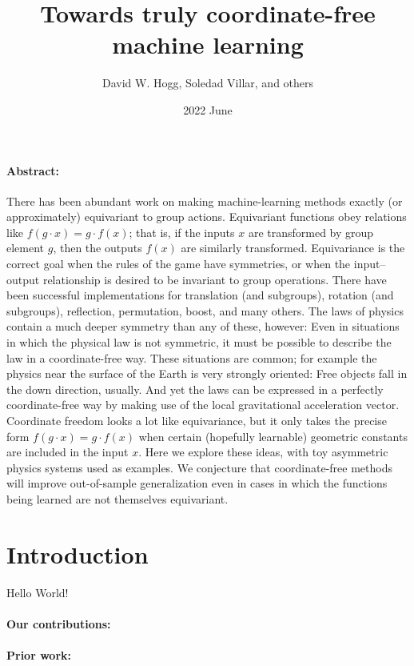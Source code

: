 \documentclass[12pt]{article}
\title{\bfseries%
  Towards truly coordinate-free\\ machine learning}
\author{%
  David W. Hogg, 
  Soledad Villar, and
  others}
\date{2022 June}
\begin{document}
\maketitle\thispagestyle{empty}

\paragraph{Abstract:}
There has been abundant work on making machine-learning methods exactly (or approximately) equivariant to group actions.
Equivariant functions obey relations like $f(g\cdot x) = g\cdot f(x)$; that is, if the inputs $x$ are transformed by group element $g$, then the outputs $f(x)$ are similarly transformed.
Equivariance is the correct goal when the rules of the game have symmetries, or when the input--output relationship is desired to be invariant to group operations.
There have been successful implementations for translation (and subgroups), rotation (and subgroups), reflection, permutation, boost, and many others.
The laws of physics contain a much deeper symmetry than any of these, however:
Even in situations in which the physical law is not symmetric, it must be possible to describe the law in a coordinate-free way.
These situations are common; for example the physics near the surface of the Earth is very strongly oriented:
Free objects fall in the down direction, usually.
And yet the laws can be expressed in a perfectly coordinate-free way by making use of the local gravitational acceleration vector.
Coordinate freedom looks a lot like equivariance, but it only takes the precise form $f(g\cdot x)=g\cdot f(x)$ when certain (hopefully learnable) geometric constants are included in the input $x$.
Here we explore these ideas, with toy asymmetric physics systems used as examples.
We conjecture that coordinate-free methods will improve out-of-sample generalization even in cases in which the functions being learned are not themselves equivariant.

\section{Introduction}

Hello World!

\paragraph{Our contributions:}

\paragraph{Prior work:}
\end{document}
